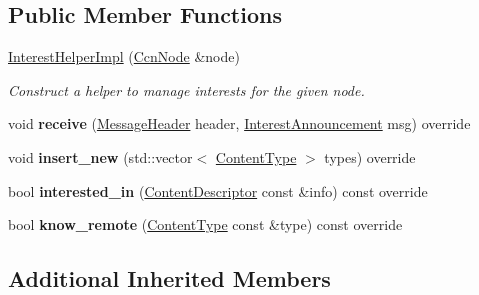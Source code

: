 \subsection*{Public Member Functions}
\begin{DoxyCompactItemize}
\item 
\hypertarget{classsma_1_1InterestHelperImpl_a23ad77fcd0a36abd6f2c663570080a82}{\hyperlink{classsma_1_1InterestHelperImpl_a23ad77fcd0a36abd6f2c663570080a82}{Interest\-Helper\-Impl} (\hyperlink{classsma_1_1CcnNode}{Ccn\-Node} \&node)}\label{classsma_1_1InterestHelperImpl_a23ad77fcd0a36abd6f2c663570080a82}

\begin{DoxyCompactList}\small\item\em Construct a helper to manage interests for the given node. \end{DoxyCompactList}\item 
\hypertarget{classsma_1_1InterestHelperImpl_ac85793ecbb9c57e35e5cf73bd9d982ba}{void {\bfseries receive} (\hyperlink{structsma_1_1MessageHeader}{Message\-Header} header, \hyperlink{structsma_1_1InterestAnnouncement}{Interest\-Announcement} msg) override}\label{classsma_1_1InterestHelperImpl_ac85793ecbb9c57e35e5cf73bd9d982ba}

\item 
\hypertarget{classsma_1_1InterestHelperImpl_acb5ea058a96877430a967c3e42208006}{void {\bfseries insert\-\_\-new} (std\-::vector$<$ \hyperlink{structsma_1_1ContentType}{Content\-Type} $>$ types) override}\label{classsma_1_1InterestHelperImpl_acb5ea058a96877430a967c3e42208006}

\item 
\hypertarget{classsma_1_1InterestHelperImpl_a397988adc785d1f8607c0be26c86c5b5}{bool {\bfseries interested\-\_\-in} (\hyperlink{structsma_1_1ContentDescriptor}{Content\-Descriptor} const \&info) const override}\label{classsma_1_1InterestHelperImpl_a397988adc785d1f8607c0be26c86c5b5}

\item 
\hypertarget{classsma_1_1InterestHelperImpl_aedbe0383cd4ba8308b23fb089bb9c399}{bool {\bfseries know\-\_\-remote} (\hyperlink{structsma_1_1ContentType}{Content\-Type} const \&type) const override}\label{classsma_1_1InterestHelperImpl_aedbe0383cd4ba8308b23fb089bb9c399}

\end{DoxyCompactItemize}
\subsection*{Additional Inherited Members}


